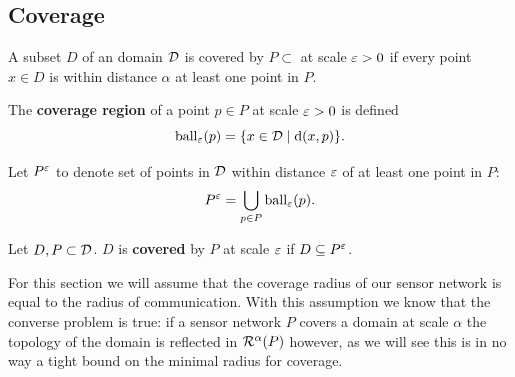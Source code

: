 \subsection{Coverage}

A subset $D$ of an domain ${\mathcal{D}}$ is covered by $P\subset$ at scale $\varepsilon > 0$ if every point $x\in D$ is within distance $\alpha$ at least one point in $P$.
\begin{definition}
    The \textbf{coverage region} of a point $p\in P$ at scale $\varepsilon > 0$ is defined
    \[\mathrm{ball}_\varepsilon(p) = \{x\in{\mathcal{D}}\mid \mathrm{d}(x, p)\}.\]
\end{definition}
Let $P^\varepsilon$ to denote set of points in ${\mathcal{D}}$ within distance $\varepsilon$ of at least one point in $P$:
\[ P^\varepsilon = \bigcup_{p\in P}\mathrm{ball}_\varepsilon(p). \]
\begin{definition}
    Let $D, P\subset{\mathcal{D}}$.
    $D$ is \textbf{covered} by $P$ at scale $\varepsilon$ if $D\subseteq P^\varepsilon$.
\end{definition}
For this section we will assume that the coverage radius of our sensor network is equal to the radius of communication.
With this assumption we know that the converse problem is true: if a sensor network $P$ covers a domain at scale $\alpha$ the topology of the domain is reflected in $\mathcal{R}^\alpha(P)$ however, as we will see this is in no way a tight bound on the minimal radius for coverage.

